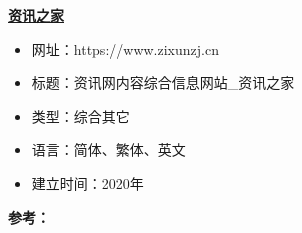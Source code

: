 \textbf{\href{https://www.zixunzj.cn}{资讯之家}}
\begin{itemize}
\item 网址：https://www.zixunzj.cn
\item 标题：资讯网内容综合信息网站_资讯之家
\item 类型：综合其它
\item 语言：简体、繁体、英文
\item 建立时间：2020年
\end{itemize}
\textbf{参考：}



